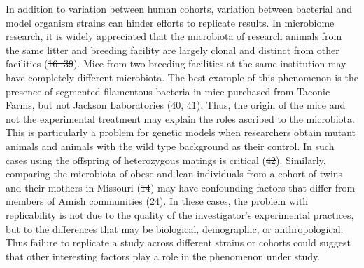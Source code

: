 \documentclass[]{article}
\providecommand{\DIFaddtex}[1]{{\protect\color{blue}\uwave{#1}}} %
\providecommand{\DIFdeltex}[1]{{\protect\color{red}\sout{#1}}}                      %
\providecommand{\DIFaddbegin}{} %
\providecommand{\DIFaddend}{} %
\providecommand{\DIFdelbegin}{} %
\providecommand{\DIFdelend}{} %
\providecommand{\DIFadd}[1]{\texorpdfstring{\DIFaddtex{#1}}{#1}} %
\providecommand{\DIFdel}[1]{\texorpdfstring{\DIFdeltex{#1}}{}} %
\begin{document}
In addition to variation between human cohorts, variation between
bacterial and model organism strains can hinder efforts to replicate
results. In microbiome research, it is widely appreciated that the
microbiota of research animals from the same litter and breeding
facility are largely clonal and distinct from other facilities (\DIFdelbegin \DIFdel{16, 39}\DIFdelend \DIFaddbegin \DIFadd{17, 45}\DIFaddend ).
Mice from two breeding facilities at the same institution may have
completely different microbiota. The best example of this phenomenon is
the presence of segmented filamentous bacteria in mice purchased from
Taconic Farms, but not Jackson Laboratories (\DIFdelbegin \DIFdel{40, 41}\DIFdelend \DIFaddbegin \DIFadd{46, 47}\DIFaddend ). Thus, the origin
of the mice and not the experimental treatment may explain the roles
ascribed to the microbiota. This is particularly a problem for genetic
models when researchers obtain mutant animals and animals with the wild
type background as their control. In such cases using the offspring of
heterozygous matings is critical (\DIFdelbegin \DIFdel{42}\DIFdelend \DIFaddbegin \DIFadd{48}\DIFaddend ). Similarly, comparing the
microbiota of obese and lean individuals from a cohort of twins and
their mothers in Missouri (\DIFdelbegin \DIFdel{14}\DIFdelend \DIFaddbegin \DIFadd{15}\DIFaddend ) may have confounding factors that differ
from members of Amish communities (24). In these cases, the problem with
replicability is not due to the quality of the investigator's
experimental practices, but to the differences that may be biological,
demographic, or anthropological. Thus failure to replicate a study
across different strains or cohorts could suggest that other interesting
factors play a role in the phenomenon under study.
\end{document}
